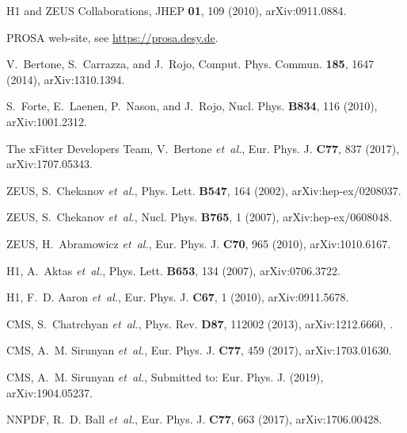 \documentclass[a4paper,11pt]{article}
\begin{document}
\begin{thebibliography}{99}
{H1 and ZEUS Collaborations},
\newblock JHEP {\bf 01}, 109 (2010), arXiv:0911.0884.

{PROSA} web-site,
\newblock see \url{https://prosa.desy.de}.

V.~Bertone, S.~Carrazza, and J.~Rojo,
\newblock Comput. Phys. Commun. {\bf 185}, 1647 (2014), arXiv:1310.1394.

S.~Forte, E.~Laenen, P.~Nason, and J.~Rojo,
\newblock Nucl. Phys. {\bf B834}, 116 (2010), arXiv:1001.2312.

The xFitter Developers Team, V.~Bertone {\em et~al.},
\newblock Eur. Phys. J. {\bf C77}, 837 (2017), arXiv:1707.05343.

ZEUS, S.~Chekanov {\em et~al.},
\newblock Phys. Lett. {\bf B547}, 164 (2002), arXiv:hep-ex/0208037.

ZEUS, S.~Chekanov {\em et~al.},
\newblock Nucl. Phys. {\bf B765}, 1 (2007), arXiv:hep-ex/0608048.

ZEUS, H.~Abramowicz {\em et~al.},
\newblock Eur. Phys. J. {\bf C70}, 965 (2010), arXiv:1010.6167.

H1, A.~Aktas {\em et~al.},
\newblock Phys. Lett. {\bf B653}, 134 (2007), arXiv:0706.3722.

H1, F.~D. Aaron {\em et~al.},
\newblock Eur. Phys. J. {\bf C67}, 1 (2010), arXiv:0911.5678.

CMS, S.~Chatrchyan {\em et~al.},
\newblock Phys. Rev. {\bf D87}, 112002 (2013), arXiv:1212.6660,
.

CMS, A.~M. Sirunyan {\em et~al.},
\newblock Eur. Phys. J. {\bf C77}, 459 (2017), arXiv:1703.01630.

CMS, A.~M. Sirunyan {\em et~al.},
\newblock Submitted to: Eur. Phys. J.  (2019), arXiv:1904.05237.

NNPDF, R.~D. Ball {\em et~al.},
\newblock Eur. Phys. J. {\bf C77}, 663 (2017), arXiv:1706.00428.


\end{thebibliography}
\end{document}
